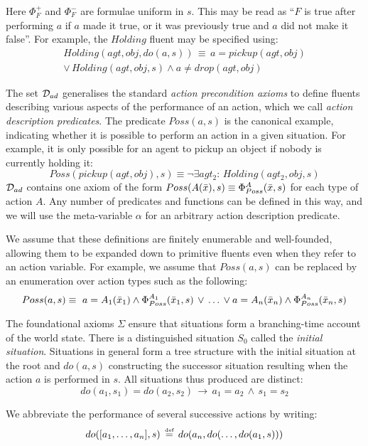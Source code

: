 Here $\Phi_{F}^{+}$ and $\Phi_{F}^{-}$ are formulae uniform in $s$.
This may be read as {}``$F$ is true after performing $a$ if $a$
made it true, or it was previously true and $a$ did not make it false''.
For example, the $Holding$ fluent may be specified using:\begin{multline*}
Holding(agt,obj,do(a,s))\,\equiv\, a=pickup(agt,obj)\\
\vee\, Holding(agt,obj,s)\wedge a\ne drop(agt,obj)\end{multline*}


\medskip{}


The set $\mathcal{D}_{ad}$ generalises the standard \emph{action precondition
axioms} \citep{pirri99contributions_sitcalc} to define fluents describing
various aspects of the performance of an action, which we call \emph{action
description predicates}. The predicate $Poss(a,s)$ is the canonical
example, indicating whether it is possible to perform an action in
a given situation. For example, it is only possible for an agent to
pickup an object if nobody is currently holding it:\[
Poss(pickup(agt,obj),s)\equiv\neg\exists agt_{2}:\, Holding(agt_{2},obj,s)\]
 $\mathcal{D}_{ad}$ contains one axiom of the form $Poss(A(\bar{x}),s)\equiv\Phi_{Poss}^{A}(\bar{x},s)$
for each type of action $A$. Any number of predicates and functions
can be defined in this way, and we will use the meta-variable $\alpha$
for an arbitrary action description predicate.

We assume that these definitions are finitely enumerable and well-founded,
allowing them to be expanded down to primitive fluents even when they
refer to an action variable. For example, we assume that $Poss(a,s)$
can be replaced by an enumeration over action types such as the following:\[
Poss(a,s)\equiv\,\, a=A_{1}(\bar{x}_{1})\wedge\Phi_{Poss}^{A_{1}}(\bar{x}_{1},s)\,\vee\,\dots\,\vee a=A_{n}(\bar{x}_{n})\wedge\Phi_{Poss}^{A_{n}}(\bar{x}_{n},s)\]


\medskip{}


The foundational axioms $\Sigma$ ensure that situations form a branching-time
account of the world state. There is a distinguished situation $S_{0}$
called the \emph{initial situation}. Situations in general form a
tree structure with the initial situation at the root and $do(a,s)$
constructing the successor situation resulting when the action $a$
is performed in $s$. All situations thus produced are distinct:\[
do(a_{1},s_{1})=do(a_{2},s_{2})\,\rightarrow\, a_{1}=a_{2}\,\wedge\, s_{1}=s_{2}\]


We abbreviate the performance of several successive actions by writing:\[
do([a_{1},\dots,a_{n}],s)\,\stackrel{\mbox{\tiny def}}{=}\, do(a_{n},do(\dots,do(a_{1},s)))\]


